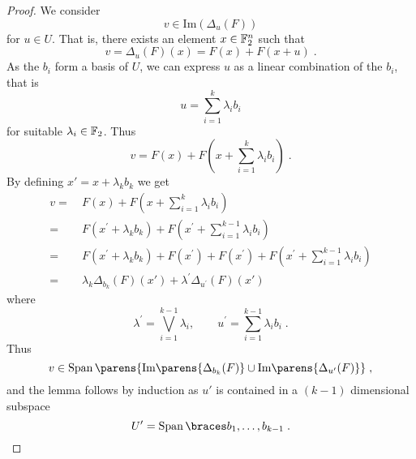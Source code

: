 \begin{proof}
    We consider
    \begin{equation*}
        v \in \mathrm{Im}(\Delta_u(F))
    \end{equation*}
    for $u \in U$.
    That is, there exists an element $x\in \mathbb{F}_2^n$ such that
    \begin{equation*}
        v= \Delta_u(F)(x)= F(x) + F(x + u)\;.
    \end{equation*}
    As the $b_i$ form a basis of $U$, we can express $u$ as a linear combination of the $b_i$, that is
    \begin{equation*}
        u= \sum_{i=1}^k  \lambda_i b_i
    \end{equation*}
    for suitable $\lambda_i \in \mathbb{F}_2$.
    Thus
    \begin{equation*}
        v=F(x) + F(x + \sum_{i=1}^k \lambda_i b_i)\;.
    \end{equation*}
    By defining $x'=x+\lambda_k b_k$ we get
    \begin{align*}
                v= &\ F(x) + F(x + \sum_{i=1}^k \lambda_i b_i) \\
                = &\ F(x^\prime + \lambda_k b_k) +F (x^\prime + \sum_{i=1}^{k-1} \lambda_i b_i) \\
                = &\ F(x^\prime + \lambda_k b_k) + F(x^\prime) + F(x^\prime)+ F(x^\prime + \sum_{i=1}^{k-1} \lambda_i b_i) \\
                = &\ \lambda_k \Delta_{b_k}(F)(x') + \lambda^\prime \Delta_{u^\prime}(F)(x')
    \end{align*}
    where
    \begin{equation*}
        \lambda^\prime = \bigvee_{i=1}^{k-1} \lambda_i, \qquad u^\prime = \sum_{i=1}^{k-1} \lambda_i b_i\;.
    \end{equation*}
    Thus
    \begin{equation*}
        v \in \SpanOp\parens{\mathrm{Im}\parens{\Delta_{b_k}(F)}\cup \mathrm{Im}\parens{\Delta_{u'}(F)}}\;,
    \end{equation*}
    and the lemma follows by induction as $u'$ is contained in a $(k-1)$ dimensional subspace
    \begin{equation*}
        U^\prime = \Span{b_1,\dots,b_{k-1}}\;.
    \end{equation*}
\end{proof}

